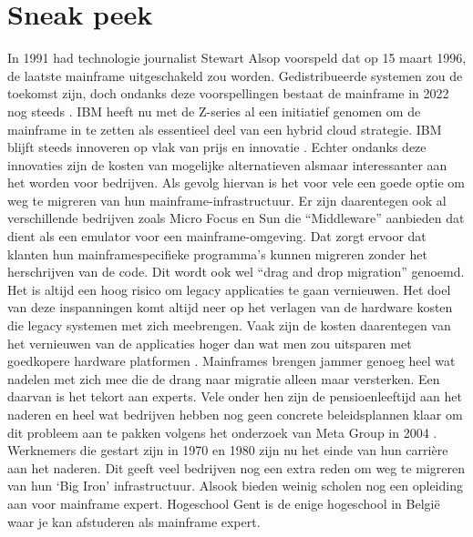 
\section{Sneak peek}
\label{sec:state-of-the-art}
In 1991 had technologie journalist Stewart Alsop voorspeld dat op 15 maart 1996, de laatste mainframe uitgeschakeld zou worden. Gedistribueerde systemen zou de toekomst zijn, doch ondanks deze voorspellingen bestaat de mainframe in 2022 nog steeds \autocite{Barnett2005}. IBM heeft nu met de Z-series al een initiatief genomen om de mainframe in te zetten als essentieel deel van een hybrid cloud strategie. IBM blijft steeds innoveren op vlak van prijs en innovatie \autocite{Smolaks2021}. Echter ondanks deze innovaties zijn de kosten van mogelijke alternatieven alsmaar interessanter aan het worden voor bedrijven. Als gevolg hiervan is het voor vele een goede optie om weg te migreren van hun mainframe-infrastructuur. Er zijn daarentegen ook al verschillende bedrijven zoals Micro Focus en Sun die “Middleware” aanbieden dat dient als een emulator voor een mainframe-omgeving. Dat zorgt ervoor dat klanten hun mainframespecifieke programma’s kunnen migreren zonder het herschrijven van de code. Dit wordt ook wel “drag and drop migration” genoemd. Het is altijd een hoog risico om legacy applicaties te gaan vernieuwen. Het doel van deze inspanningen komt altijd neer op het verlagen van de hardware kosten die legacy systemen met zich meebrengen. Vaak zijn de kosten daarentegen van het vernieuwen van de applicaties hoger dan wat men zou uitsparen met goedkopere hardware platformen \autocite{Bingell2014}. Mainframes brengen jammer genoeg heel wat nadelen met zich mee die de drang naar migratie alleen maar versterken. Een daarvan is het tekort aan experts. Vele onder hen zijn de pensioenleeftijd aan het naderen en heel wat bedrijven hebben nog geen concrete beleidsplannen klaar om dit probleem aan te pakken volgens het onderzoek van Meta Group in 2004 \autocite{Bakker2006}. Werknemers die gestart zijn in 1970 en 1980 zijn nu het einde van hun carrière aan het naderen. Dit geeft veel bedrijven nog een extra reden om weg te migreren van hun ‘Big Iron’ infrastructuur. Alsook bieden weinig scholen nog een opleiding aan voor mainframe expert. Hogeschool Gent is de enige hogeschool in België waar je kan afstuderen als mainframe expert.

 

